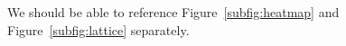 \documentclass[onecolumn,11pt]{article}
\begin{document}
We should be able to reference Figure~\ref{subfig:heatmap} and Figure~\ref{subfig:lattice} separately.

%



\clearpage
\setcounter{table}{0}
        \renewcommand{\thetable}{S\arabic{table}}%
\setcounter{figure}{0}
        \renewcommand{\thefigure}{S\arabic{figure}}%
\renewcommand{\listfigurename}{List of Supporting Figures}
\renewcommand{\contentsname}{List of Supporting Text}


\end{document}
